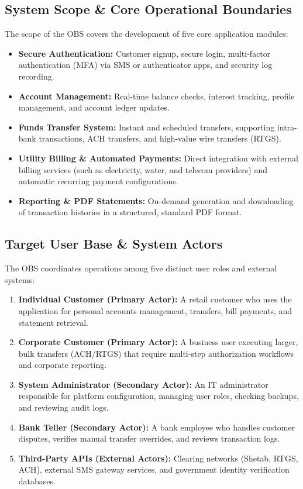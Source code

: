 \documentclass[11pt,a4paper]{article}
\begin{document}
\subsection{System Scope \& Core Operational Boundaries}
The scope of the OBS covers the development of five core application modules:
\begin{itemize}
    \item \textbf{Secure Authentication:} Customer signup, secure login, multi-factor authentication (MFA) via SMS or authenticator apps, and security log recording.
    \item \textbf{Account Management:} Real-time balance checks, interest tracking, profile management, and account ledger updates.
    \item \textbf{Funds Transfer System:} Instant and scheduled transfers, supporting intra-bank transactions, ACH transfers, and high-value wire transfers (RTGS).
    \item \textbf{Utility Billing \& Automated Payments:} Direct integration with external billing services (such as electricity, water, and telecom providers) and automatic recurring payment configurations.
    \item \textbf{Reporting \& PDF Statements:} On-demand generation and downloading of transaction histories in a structured, standard PDF format.
\end{itemize}

\subsection{Target User Base \& System Actors}
The OBS coordinates operations among five distinct user roles and external systems:
\begin{enumerate}
    \item \textbf{Individual Customer (Primary Actor):} A retail customer who uses the application for personal accounts management, transfers, bill payments, and statement retrieval.
    \item \textbf{Corporate Customer (Primary Actor):} A business user executing larger, bulk transfers (ACH/RTGS) that require multi-step authorization workflows and corporate reporting.
    \item \textbf{System Administrator (Secondary Actor):} An IT administrator responsible for platform configuration, managing user roles, checking backups, and reviewing audit logs.
    \item \textbf{Bank Teller (Secondary Actor):} A bank employee who handles customer disputes, verifies manual transfer overrides, and reviews transaction logs.
    \item \textbf{Third-Party APIs (External Actors):} Clearing networks (Shetab, RTGS, ACH), external SMS gateway services, and government identity verification databases.
\end{enumerate}
\end{document}
